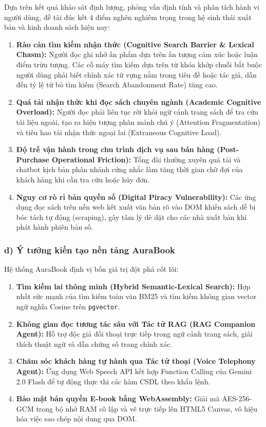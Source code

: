 \documentclass[11pt, a4paper]{report}
\begin{document}
Dựa trên kết quả khảo sát định lượng, phỏng vấn định tính và phân tích hành vi người dùng, đề tài đúc kết 4 điểm nghẽn nghiêm trọng trong hệ sinh thái xuất bản và kinh doanh sách hiện nay:
\begin{enumerate}
    \item \textbf{Rào cản tìm kiếm nhận thức (Cognitive Search Barrier \& Lexical Chasm):} Người đọc ghi nhớ ấn phẩm dựa trên ấn tượng cảm xúc hoặc luận điểm trừu tượng. Các cỗ máy tìm kiếm dựa trên từ khóa khớp chuỗi bắt buộc người dùng phải biết chính xác từ vựng nằm trong tiêu đề hoặc tác giả, dẫn đến tỷ lệ từ bỏ tìm kiếm (Search Abandonment Rate) tăng cao.
    \item \textbf{Quá tải nhận thức khi đọc sách chuyên ngành (Academic Cognitive Overload):} Người đọc phải liên tục rời khỏi ngữ cảnh trang sách để tra cứu tài liệu ngoài, tạo ra hiện tượng phân mảnh chú ý (Attention Fragmentation) và tiêu hao tải nhận thức ngoại lai (Extraneous Cognitive Load).
    \item \textbf{Độ trễ vận hành trong chu trình dịch vụ sau bán hàng (Post-Purchase Operational Friction):} Tổng đài thường xuyên quá tải và chatbot kịch bản phân nhánh cứng nhắc làm tăng thời gian chờ đợi của khách hàng khi cần tra cứu hoặc hủy đơn.
    \item \textbf{Nguy cơ rò rỉ bản quyền số (Digital Piracy Vulnerability):} Các ứng dụng đọc sách trên nền web kết xuất văn bản rõ vào DOM khiến sách dễ bị bóc tách tự động (scraping), gây tâm lý dè dặt cho các nhà xuất bản khi phát hành phiên bản số.
\end{enumerate}

\subsubsection{d) Ý tưởng kiến tạo nền tảng AuraBook}

Hệ thống AuraBook định vị bốn giá trị đột phá cốt lõi:
\begin{enumerate}
    \item \textbf{Tìm kiếm lai thông minh (Hybrid Semantic-Lexical Search):} Hợp nhất sức mạnh của tìm kiếm toàn văn BM25 và tìm kiếm không gian vector ngữ nghĩa Cosine trên \texttt{pgvector}.
    \item \textbf{Không gian đọc tương tác sâu với Tác tử RAG (RAG Companion Agent):} Hỗ trợ độc giả đối thoại trực tiếp trong ngữ cảnh trang sách, giải thích thuật ngữ và dẫn chứng số trang chính xác.
    \item \textbf{Chăm sóc khách hàng tự hành qua Tác tử thoại (Voice Telephony Agent):} Ứng dụng Web Speech API kết hợp Function Calling của Gemini 2.0 Flash để tự động thực thi các hàm CSDL theo khẩu lệnh.
    \item \textbf{Bảo mật bản quyền E-book bằng WebAssembly:} Giải mã AES-256-GCM trong bộ nhớ RAM cô lập và vẽ trực tiếp lên HTML5 Canvas, vô hiệu hóa việc sao chép nội dung qua DOM.
\end{enumerate}
\end{document}
